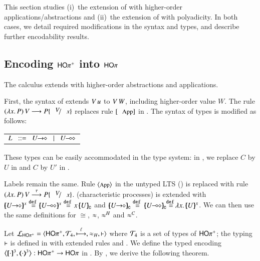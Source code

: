 \noi This section studies %
(i)~the extension of \HOp with higher-order applications/abstractions 
and 
(ii)~the extension of \HOp
with polyadicity.
In both cases, we detail required modifications in the syntax
and types, and
describe further encodability results.
 
\subsection{Encoding  $\mathsf{HO\pi^{+}}$ into $\mathsf{HO}\pi$}
\label{subsec:hop}
\noi 
The calculus \HOpp 
extends \HOp with higher-order abstractions and applications.

\noi First, the syntax of  extends 
$V\, {u}$ to 
 $V\, {W}$, including higher-order value $W$. 
The rule $\appl{(\abs{x}{P})}{V} \red P \subst{V}{x}$
replaces
rule $\orule{App}$ in .
The syntax of types is modified as follows: %
\begin{center}
\begin{tabular}{c}
$L \bnfis \shot{U} \bnfbar \lhot{U}$
\end{tabular}
\end{center}
These types can be easily accommodated in the type system:
 in , 
we replace $C$ by $U$ in  and $C$ by $U'$ in .
\smallskip 

Labels remain the same. Rule ${\footnotesize \langle \textrm{App} \rangle}$ in the untyped LTS
() 
is replaced with rule $\appl{(\abs{x}{P})}{V} \by{\tau} P \subst{V}{x}$.
 (characteristic processes) is extended with  
${\mapchar{\shot{U}}{x}} \defeq\! \mapchar{\lhot{U}}{x} \defeq\! {\appl{x}{\omapchar{U}}}$ and 
${\omapchar{\shot{U}}} \defeq {\omapchar{\lhot{U}}} \!\!\defeq\!\! \abs{x}{\mapchar{U}{x}}$. 
We can then use the same definitions for $\cong$, $\approx$, $\approx^H$ and $\approx^C$. 

\smallskip 

Let $\mathcal{L}_{\mathsf{HO\pi^{+}}}=\langle \mathsf{HO\pi^{+}}, {\cal{T}}_4, \stackrel{\ell}{\longmapsto}, \approx_H, \vdash \rangle$
where 
${\cal{T}}_4$ is a set of types of $\mathsf{HO\pi^{+}}$;  
the typing $\vdash$ is defined in 
 with extended rules  and . 
We define 
the typed encoding $\enco{\map{\cdot}^{3}, \mapt{\cdot}^{3}%
}: \HOpp \to \HOp$ in 
.
By , 
we derive the following theorem. 

